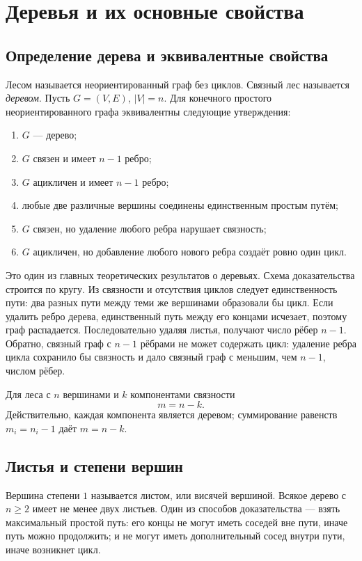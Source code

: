 \section{Деревья и их основные свойства}
\label{sec:trees-properties}

\subsection{Определение дерева и эквивалентные свойства}

Лесом называется неориентированный граф без циклов. Связный лес называется
\emph{деревом}. Пусть $G=(V,E)$, $|V|=n$. Для конечного простого неориентированного
графа эквивалентны следующие утверждения:
\begin{enumerate}
    \item $G$ --- дерево;
    \item $G$ связен и имеет $n-1$ ребро;
    \item $G$ ацикличен и имеет $n-1$ ребро;
    \item любые две различные вершины соединены единственным простым путём;
    \item $G$ связен, но удаление любого ребра нарушает связность;
    \item $G$ ацикличен, но добавление любого нового ребра создаёт ровно один цикл.
\end{enumerate}

Это один из главных теоретических результатов о деревьях. Схема доказательства
строится по кругу. Из связности и отсутствия циклов следует единственность пути:
два разных пути между теми же вершинами образовали бы цикл. Если удалить ребро
дерева, единственный путь между его концами исчезает, поэтому граф распадается.
Последовательно удаляя листья, получают число рёбер $n-1$. Обратно, связный граф
с $n-1$ рёбрами не может содержать цикл: удаление ребра цикла сохранило бы
связность и дало связный граф с меньшим, чем $n-1$, числом рёбер.

Для леса с $n$ вершинами и $k$ компонентами связности
\[
    m=n-k.
\]
Действительно, каждая компонента является деревом; суммирование равенств
$m_i=n_i-1$ даёт $m=n-k$.

\subsection{Листья и степени вершин}

Вершина степени $1$ называется листом, или висячей вершиной. Всякое дерево с
$n\ge2$ имеет не менее двух листьев. Один из способов доказательства --- взять
максимальный простой путь: его концы не могут иметь соседей вне пути, иначе путь
можно продолжить; и не могут иметь дополнительный сосед внутри пути, иначе
возникнет цикл.

